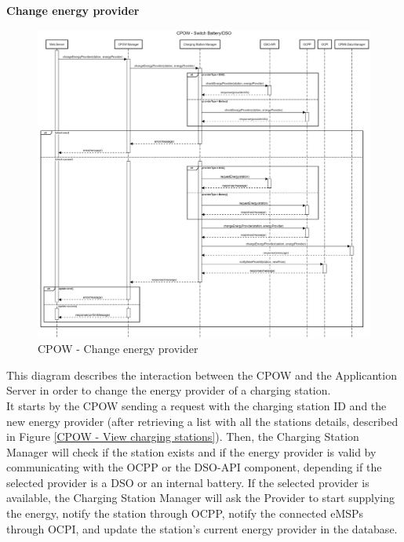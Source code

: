 \documentclass[table, 12pt]{article}
\begin{document}
\textbf{Change energy provider}
\begin{center}
    \begin{figure}[H]
        \includegraphics[scale=0.15, center]{assets/sequenceDiagrams/CPOW change energy.png}
        \caption{CPOW - Change energy provider}
        \label{CPOW - Change energy provider}
    \end{figure}
\end{center}
\newpage
This diagram describes the interaction between the CPOW and the Applicantion Server in order to change the energy provider of a charging station.\\
It starts by the CPOW sending a request with the charging station ID and the new energy provider (after retrieving a list with all the stations details, described in Figure \ref*{CPOW - View charging stations}).
Then, the Charging Station Manager will check if the station exists and if the energy provider is valid by communicating with the OCPP or the DSO-API component, depending if the selected provider is a DSO or an internal battery.
If the selected provider is available, the Charging Station Manager will ask the Provider to start supplying the energy, notify the station through OCPP, notify the connected eMSPs through OCPI, and update the station's current energy provider in the database.
\newpage
\end{document}
